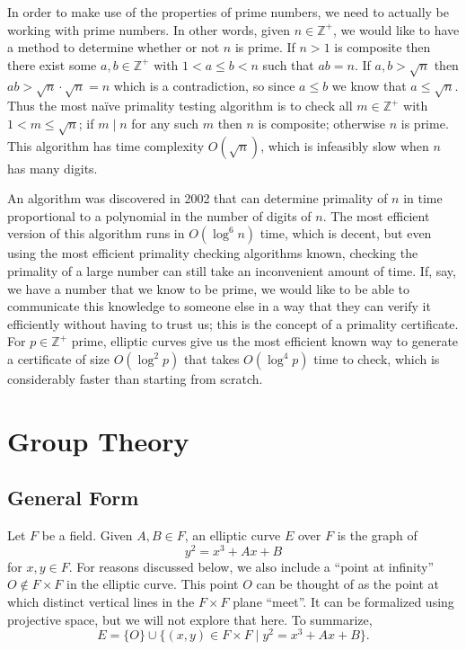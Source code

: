 \documentclass[12pt]{article}
\newcommand*\Z{\mathbb{Z}}
\newcommand*\cross{\times}
\newcommand*\divides{\mid}
\newcommand*\set[3][]{#1\{ #2 \suchthat[#1] #3 #1\}}
\newcommand*\suchthat[1][]{\mathrel{#1|}}
\newcommand*\union{\cup}
\begin{document}
In order to make use of the properties of prime numbers, we need to actually be
working with prime numbers. In other words, given $n \in \Z^+$, we would like to
have a method to determine whether or not $n$ is prime. If $n > 1$ is composite
then there exist some $a, b \in \Z^+$ with $1 < a \leq b < n$ such that $ab =
n$. If $a, b > \sqrt{n}$ then $ab > \sqrt{n} \cdot \sqrt{n} = n$ which is a
contradiction, so since $a \leq b$ we know that $a \leq \sqrt{n}$. Thus the most
na\"ive primality testing algorithm is to check all $m \in \Z^+$ with $1 < m
\leq \sqrt{n}$; if $m \divides n$ for any such $m$ then $n$ is composite;
otherwise $n$ is prime. This algorithm has time complexity $O(\sqrt{n})$, which
is infeasibly slow when $n$ has many digits.

An algorithm was discovered in 2002 that can determine primality of $n$ in time
proportional to a polynomial in the number of digits of $n$.\cite{aks} The most
efficient version of this algorithm runs in $O(\log^6 n)$ time, which is decent,
but even using the most efficient primality checking algorithms known, checking
the primality of a large number can still take an inconvenient amount of time.
If, say, we have a number that we know to be prime, we would like to be able to
communicate this knowledge to someone else in a way that they can verify it
efficiently without having to trust us; this is the concept of a primality
certificate. For $p \in \Z^+$ prime, elliptic curves give us the most efficient
known way to generate a certificate of size $O(\log^2 p)$ that takes $O(\log^4
p)$ time to check, which is considerably faster than starting from
scratch.\cite{verify}

\section{Group Theory}

\subsection{General Form}

Let $F$ be a field. Given $A, B \in F$, an elliptic curve $E$ over $F$ is the
graph of
\[ y^2 = x^3 + Ax + B \]
for $x, y \in F$. For reasons discussed below, we also include a ``point at
infinity'' $O \notin F \cross F$ in the elliptic curve. This point $O$ can be
thought of as the point at which distinct vertical lines in the $F \cross F$
plane ``meet''. It can be formalized using projective space, but we will not
explore that here.\cite{book} To summarize,
\[ E = \{O\} \union \set{(x, y) \in F \cross F}{y^2 = x^3 + Ax + B}. \]
\end{document}
